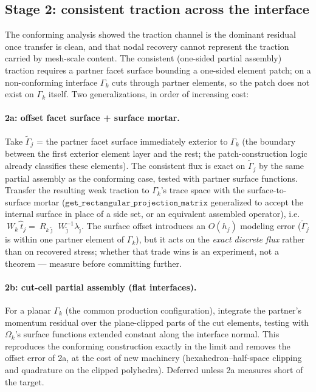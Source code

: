\documentclass[11pt]{article}
\begin{document}
\subsection{Stage 2: consistent traction across the interface}

The conforming analysis showed the traction channel is the dominant
residual once transfer is clean, and that nodal recovery cannot
represent the traction carried by mesh-scale content.  The consistent
(one-sided partial assembly) traction requires a partner facet surface
bounding a one-sided element patch; on a non-conforming interface
$\Gamma_k$ cuts through partner elements, so the patch does not exist
on $\Gamma_k$ itself.  Two generalizations, in order of increasing
cost:

\paragraph{2a: offset facet surface + surface mortar.}  Take
$\tilde\Gamma_j$ = the partner facet surface immediately exterior to
$\Gamma_k$ (the boundary between the first exterior element layer and
the rest; the patch-construction logic already classifies these
elements).  The consistent flux is exact on $\tilde\Gamma_j$ by the
same partial assembly as the conforming case, tested with partner
surface functions.  Transfer the resulting weak traction to
$\Gamma_k$'s trace space with the surface-to-surface mortar
($\texttt{get\_rectangular\_projection\_matrix}$ generalized to accept
the internal surface in place of a side set, or an equivalent
assembled operator), i.e.\
$~W_k \hat{~t}_j = ~R_{k\tilde\jmath}\, ~W_{\tilde\jmath}^{-1}
\lambda_{\tilde\jmath}$.
The surface offset introduces an $O(h_j)$ modeling error
($\tilde\Gamma_j$ is within one partner element of $\Gamma_k$), but it
acts on the \emph{exact discrete flux} rather than on recovered
stress; whether that trade wins is an experiment, not a theorem ---
measure before committing further.

\paragraph{2b: cut-cell partial assembly (flat interfaces).}  For a
planar $\Gamma_k$ (the common production configuration), integrate the
partner's momentum residual over the plane-clipped parts of the cut
elements, testing with $\Omega_k$'s surface functions extended
constant along the interface normal.  This reproduces the
conforming construction exactly in the limit and removes the offset
error of 2a, at the cost of new machinery (hexahedron--half-space
clipping and quadrature on the clipped polyhedra).  Deferred unless 2a
measures short of the target.
\end{document}
